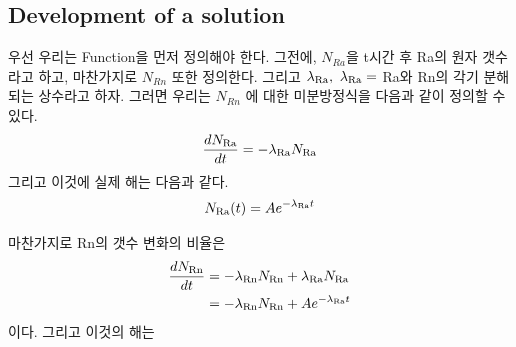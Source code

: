 \documentclass[11pt]{article}
\begin{document}
\subsection{Development of a solution} 
우선 우리는 Function을 먼저 정의해야 한다. 그전에, $N_{Ra}$을 t시간 후 Ra의 원자 갯수라고 하고, 마찬가지로 $N_{Rn}$ 또한 정의한다. 그리고 $\lambda_{\rm Ra},\ \lambda_{\rm Ra} =$ Ra와 Rn의 각기 분해되는 상수라고 하자. 그러면 우리는 $N_{Rn}$ 에 대한 미분방정식을 다음과 같이 정의할 수 있다.
\begin{equation}
\frac{dN_{\rm Ra}}{dt} = -\lambda_{\rm Ra} N_{\rm Ra}
\end{equation}
그리고 이것에 실제 해는 다음과 같다.
\begin{equation}
N_{\rm Ra}(t) = A e^{-\lambda_{\rm Ra} t}
\end{equation}

마찬가지로 Rn의 갯수 변화의 비율은
\begin{equation}
\begin{split}
\begin{aligned}
\frac{dN_{\rm Rn}}{dt} &= -\lambda_{\rm Rn} N_{\rm Rn} + \lambda_{\rm Ra} N_{\rm Ra}
\\
&= -\lambda_{\rm Rn} N_{\rm Rn} + A e^{-\lambda_{\rm Ra} t}
\end{aligned}
\end{split}
\end{equation}
이다. 그리고 이것의 해는
\end{document}
